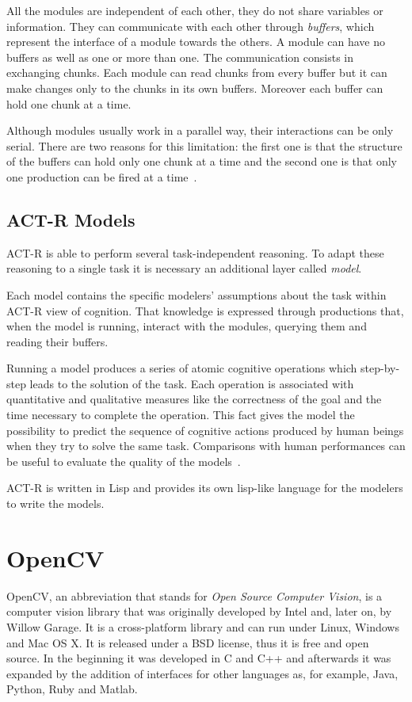 	
		All the modules are independent of each other, they do not share variables or information. They can communicate with each other through \emph{buffers}, which represent the interface of a module towards the others. A module can have no buffers as well as one or more than one. The communication consists in exchanging chunks. Each module can read chunks from every buffer but it can make changes only to the chunks in its own buffers. Moreover each buffer can hold one chunk at a time. 

		Although modules usually work in a parallel way, their interactions can be only serial.
		There are two reasons for this limitation: the first one is that the structure of the buffers can hold only one chunk at a time and the second one is that only one production can be fired at a time~\cite{actr6refman}.
	
	\subsection{ACT-R Models}\label{modelSect}
	ACT-R is able to perform several task-independent reasoning. 
	To adapt these reasoning to a single task it is necessary an additional layer called \emph{model}.

	Each model contains the specific modelers' assumptions about the task within ACT-R view of cognition. That knowledge is expressed through productions that, when the model is running, interact with the modules, querying them and reading their buffers. 
	
	Running a model produces a series of atomic cognitive operations which step-by-step leads to the solution of the task. Each operation is associated with quantitative and qualitative measures like the correctness of the goal and the time necessary to complete the operation.
	This fact gives the model the possibility to predict the sequence of cognitive actions produced by human beings when they try to solve the same task.
	Comparisons with human performances can be useful to evaluate the quality of the models~\cite{Sears2012}.

	ACT-R is written in Lisp and provides its own lisp-like language for the modelers to write the models.



		

  \section{OpenCV}
	\mbox{OpenCV}, an abbreviation that stands for \emph{Open Source Computer Vision}, is a computer vision library that was originally developed by Intel and, later on, by Willow Garage.
	It is a cross-platform library and can run under Linux, Windows and Mac OS X. 
	It is released under a BSD license, thus it is free and open source. 
	In the beginning it was developed in C and C++ and afterwards it was expanded by the addition of interfaces for other languages as, for example, Java, Python, Ruby and Matlab. 

